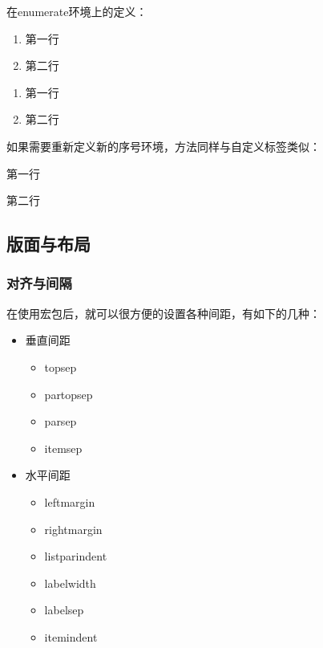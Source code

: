     在enumerate环境上的定义：
    \begin{texshow}
        \begin{enumerate}[label=\roman*)]
            \item 第一行
            \item 第二行
        \end{enumerate}
        \begin{enumerate}[label=\alph*--]
            \item 第一行
            \item 第二行
        \end{enumerate}
    \end{texshow}

    如果需要重新定义新的序号环境，方法同样与自定义标签类似：
    \begin{texshow}
        \begin{romanlist}
            \item 第一行
            \item 第二行
        \end{romanlist}
    \end{texshow}

    \subsection{版面与布局}
    \subsubsection{对齐与间隔}
    在使用宏包后，就可以很方便的设置各种间距，有如下的几种：
    \begin{itemize}
        \item 垂直间距
        \begin{itemize}
            \item topsep
            \item partopsep
            \item parsep
            \item itemsep
        \end{itemize}
        \item 水平间距
        \begin{itemize}
            \item leftmargin
            \item rightmargin
            \item listparindent
            \item labelwidth
            \item labelsep
            \item itemindent
        \end{itemize}
    \end{itemize}
    
